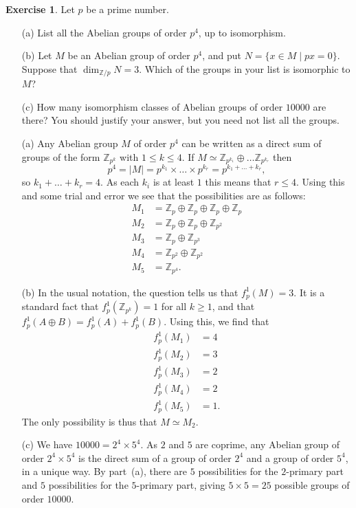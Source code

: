 \documentclass{amsart}
\newcommand{\Z}         {{\mathbb{Z}}}
\newcommand{\tm}        {\times}
\newcommand{\st}        {\;|\;}
\newcommand{\ip}[1]     {\langle #1\rangle}
\newcommand{\op}        {\oplus}
\renewcommand{\:}{\colon}
\theoremstyle{definition}
\newtheorem{exercise}{Exercise}[section]
\renewenvironment{solution}{\SolutionAtEnd}{\endSolutionAtEnd}
\begin{document}
\begin{exercise}
 Let $p$ be a prime number.
 \begin{itemize}
  \item[(a)] List all the Abelian groups of order $p^4$, up to
   isomorphism.
  \item[(b)] Let $M$ be an Abelian group of order $p^4$, and put
   $N=\{x\in M\st px=0\}$.  Suppose that $\dim_{\Z/p}N=3$.  Which of
   the groups in your list is isomorphic to $M$?
  \item[(c)] How many isomorphism classes of Abelian groups of order
   $10000$ are there?  You should justify your answer, but you need
   not list all the groups.
 \end{itemize}
\end{exercise}
\begin{solution}
 \begin{itemize}
  \item[(a)] Any Abelian group $M$ of order $p^4$ can be written as a
   direct sum of groups of the form $\Z_{p^k}$ with $1\leq k\leq 4$.
   If $M\simeq\Z_{p^{k_1}}\op\ldots\Z_{p^{k_r}}$ then
   \[ p^4=|M|=p^{k_1}\tm\ldots\tm p^{k_r}=p^{k_1+\ldots+k_r}, \] 
   so $k_1+\ldots+k_r=4$.  As each $k_i$ is at least $1$ this means
   that $r\leq 4$.  Using this and some trial and error we see that
   the possibilities are as follows:
   \begin{align*}
    M_1 &= \Z_p\op\Z_p\op\Z_p\op\Z_p \\
    M_2 &= \Z_p\op\Z_p\op\Z_{p^2} \\
    M_3 &= \Z_p\op\Z_{p^3} \\
    M_4 &= \Z_{p^2}\op\Z_{p^2} \\
    M_5 &= \Z_{p^4}.
   \end{align*}
  \item[(b)] In the usual notation, the question tells us that
   $f^1_p(M)=3$.  It is a standard fact that $f^1_p(\Z_{p^k})=1$ for
   all $k\geq 1$, and that $f^1_p(A\op B)=f^1_p(A)+f^1_p(B)$.  Using
   this, we find that
   \begin{align*}
    f^1_p(M_1) &= 4 \\
    f^1_p(M_2) &= 3 \\
    f^1_p(M_3) &= 2 \\
    f^1_p(M_4) &= 2 \\
    f^1_p(M_5) &= 1.
   \end{align*}
   The only possibility is thus that $M\simeq M_2$.
  \item[(c)] We have $10000=2^4\tm 5^4$.  As $2$ and $5$ are coprime,
   any Abelian group of order $2^4\tm 5^4$ is the direct sum of a
   group of order $2^4$ and a group of order $5^4$, in a unique way.
   By part~(a), there are $5$ possibilities for the $2$-primary part
   and $5$ possibilities for the $5$-primary part, giving $5\tm 5=25$
   possible groups of order $10000$.
 \end{itemize}
\end{solution}
\end{document}
